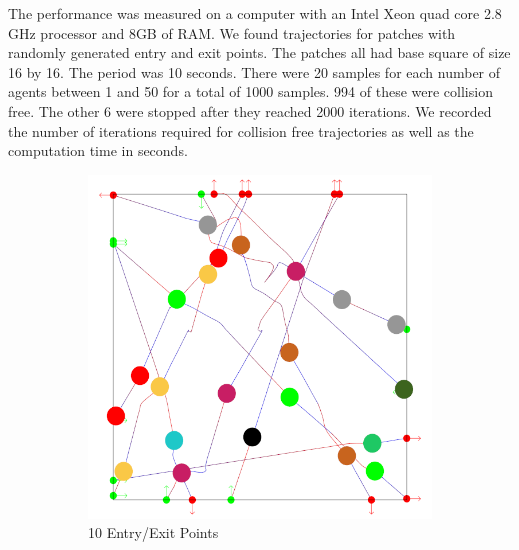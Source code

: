 The performance was measured on a computer with an Intel Xeon quad core 2.8 GHz processor and 8GB of RAM. We found trajectories for patches with randomly generated entry and exit points. The patches all had base square of size 16 by 16. The period was 10 seconds. There were 20 samples for each number of agents between 1 and 50 for a total of 1000 samples. 994 of these were collision free. The other 6 were stopped after they reached 2000 iterations. We recorded the number of iterations required for collision free trajectories as well as the computation time in seconds.

\begin{figure}[t]
 \centering
%
\begin{subfigure}[b]{0.24\linewidth}
	\includegraphics[width=\linewidth]{images/res-10-entry-exit.png}
	\caption{10 Entry/Exit Points}
 \end{subfigure}
%
 \begin{subfigure}[b]{0.24\linewidth}

\end{subfigure}
\end{figure}
